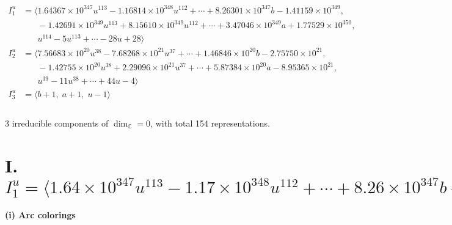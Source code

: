 \documentclass[1p]{elsarticle_modified}
\theoremstyle{definition}
\begin{document}
\begin{align*}
I^u_{1}&=\langle 
1.64367\times10^{347} u^{113}-1.16814\times10^{348} u^{112}+\cdots+8.26301\times10^{347} b-1.41159\times10^{349},\\
\phantom{I^u_{1}}&\phantom{= \langle  }-1.42691\times10^{349} u^{113}+8.15610\times10^{349} u^{112}+\cdots+3.47046\times10^{349} a+1.77529\times10^{350},\\
\phantom{I^u_{1}}&\phantom{= \langle  }u^{114}-5 u^{113}+\cdots-28 u+28\rangle \\
I^u_{2}&=\langle 
7.56683\times10^{20} u^{38}-7.68268\times10^{21} u^{37}+\cdots+1.46846\times10^{20} b-2.75750\times10^{21},\\
\phantom{I^u_{2}}&\phantom{= \langle  }-1.42755\times10^{20} u^{38}+2.29096\times10^{21} u^{37}+\cdots+5.87384\times10^{20} a-8.95365\times10^{21},\\
\phantom{I^u_{2}}&\phantom{= \langle  }u^{39}-11 u^{38}+\cdots+44 u-4\rangle \\
I^u_{3}&=\langle 
b+1,\;a+1,\;u-1\rangle \\
\\
\end{align*}
\raggedright * 3 irreducible components of $\dim_{\mathbb{C}}=0$, with total 154 representations.\\
\newpage
\renewcommand{\arraystretch}{1}
\centering \section*{I. $I^u_{1}= \langle 1.64\times10^{347} u^{113}-1.17\times10^{348} u^{112}+\cdots+8.26\times10^{347} b-1.41\times10^{349},\;-1.43\times10^{349} u^{113}+8.16\times10^{349} u^{112}+\cdots+3.47\times10^{349} a+1.78\times10^{350},\;u^{114}-5 u^{113}+\cdots-28 u+28 \rangle$}
\flushleft \textbf{(i) Arc colorings}\\
\end{document}
